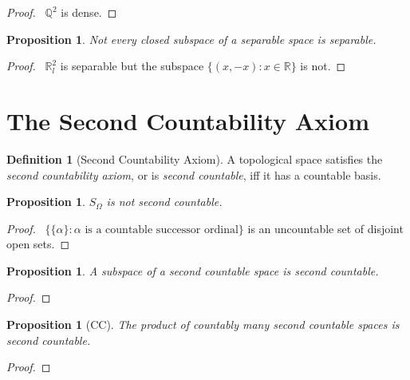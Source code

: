 \documentclass{report}
\let\qed\relax
\newtheorem{prop}[lm]{Proposition}
\theoremstyle{definition}
\newtheorem{df}[lm]{Definition}
\begin{document}
 \begin{proof}
   \pf\ $\mathbb{Q}^2$ is dense. \qed
 \end{proof}

 \begin{prop}
   Not every closed subspace of a separable space is separable.
 \end{prop}

 \begin{proof}
   \pf\ $\mathbb{R}_l^2$ is separable but the subspace $\{ (x, -x) : x \in \mathbb{R} \}$ is not. \qed
 \end{proof}

  \section{The Second Countability Axiom}

    \begin{df}[Second Countability Axiom]
    A topological space satisfies the \emph{second countability axiom}, or is
    \emph{second countable}, iff it has a countable basis.
  \end{df}

   \begin{prop}
  $S_\Omega$ is not second countable.
 \end{prop}

 \begin{proof}
   \pf\ $\{ \{ \alpha \} : \alpha \text{ is a countable successor ordinal} \}$
is an uncountable set of disjoint open sets. \qed
 \end{proof}

  \begin{prop}
    \label{prop:topology:second_countable:subspace}
   A subspace of a second countable space is second countable.
  \end{prop}

  \begin{proof}
   \pf
   \qed
  \end{proof}

    \begin{prop}[CC]
   The product of countably many second countable spaces is second countable.
  \end{prop}

  \begin{proof}
   \pf
\qed
  \end{proof}
\end{document}
